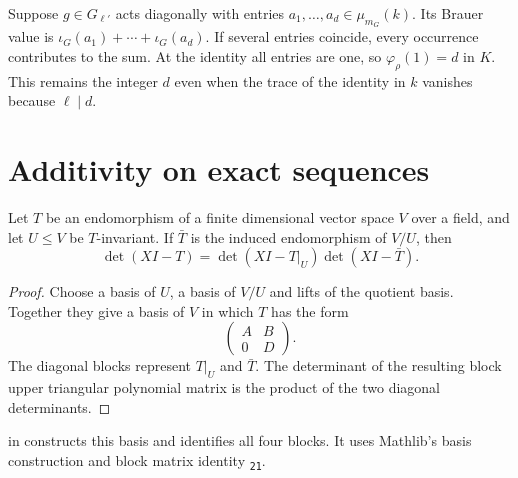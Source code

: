 \begin{example}
Suppose $g\in G_{\ell'}$ acts diagonally with entries
$a_1,\ldots,a_d\in\mu_{m_G}(k)$. Its Brauer value is
$\iota_G(a_1)+\cdots+\iota_G(a_d)$. If several entries coincide, every
occurrence contributes to the sum. At the identity all entries are one,
so $\varphi_\rho(1)=d$ in $K$. This remains the integer $d$ even when the
trace of the identity in $k$ vanishes because $\ell\mid d$.
\end{example}

\section{Additivity on exact sequences}
\label{lib:brauer:exactness}

\begin{lemma}
\label{lib:brauer:charpoly-factorisation}
Let $T$ be an endomorphism of a finite dimensional vector space $V$ over a
field, and let $U\leq V$ be $T$-invariant. If $\bar T$ is the induced
endomorphism of $V/U$, then
\[
 \det(XI-T)=\det(XI-T|_U)\det(XI-\bar T).
\]
\end{lemma}
\begin{proof}
Choose a basis of $U$, a basis of $V/U$ and lifts of the quotient basis.
Together they give a basis of $V$ in which $T$ has the form
\[
 \begin{pmatrix}A&B\\0&D\end{pmatrix}.
\]
The diagonal blocks represent $T|_U$ and $\bar T$. The determinant of the
resulting block upper triangular polynomial matrix is the product of the
two diagonal determinants.
\end{proof}

\begin{implementation}
 in
 constructs this basis and
identifies all four blocks. It uses Mathlib's basis construction
 and block matrix identity
\textsubscript{\texttt{21}}.
\end{implementation}


